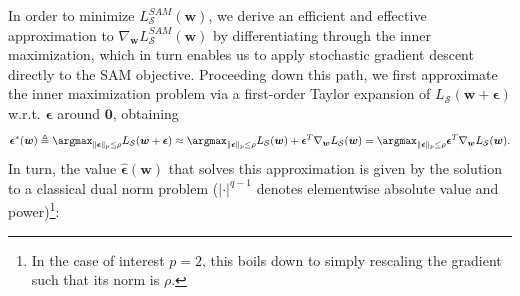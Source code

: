 \documentclass{article} %
\begin{document}
In order to minimize $L^{SAM}_\mathcal{S}(\boldsymbol{w})$, we derive an efficient and effective approximation to $\nabla_{\boldsymbol{w}} L^{SAM}_\mathcal{S}(\boldsymbol{w})$ by differentiating through the inner maximization, which in turn enables us to apply stochastic gradient descent directly to the SAM objective.  Proceeding down this path, we first approximate the inner maximization problem via a first-order Taylor expansion of $L_\mathcal{S}(\boldsymbol{w}+\boldsymbol{\epsilon})$ w.r.t. $\boldsymbol{\epsilon}$ around $\boldsymbol{0}$, obtaining
$${\boldsymbol{\epsilon}^*}(\boldsymbol{w}) \triangleq \argmax_{\|\boldsymbol{\epsilon}\|_p \leq \rho} L_\mathcal{S}(\boldsymbol{w}+\boldsymbol{\epsilon}) \approx \argmax_{\|\boldsymbol{\epsilon}\|_p \leq \rho} L_\mathcal{S}(\boldsymbol{w}) + \boldsymbol{\epsilon}^T \nabla_{\boldsymbol{w}} L_\mathcal{S}(\boldsymbol{w}) = \argmax_{\|\boldsymbol{\epsilon}\|_p \leq \rho} \boldsymbol{\epsilon}^T \nabla_{\boldsymbol{w}} L_\mathcal{S}(\boldsymbol{w}).$$
In turn, the value $\hat{\boldsymbol{\epsilon}}(\boldsymbol{w})$ that solves this approximation is given by the solution to a classical dual norm problem ($|\cdot |^{q-1}$ denotes elementwise absolute value and power)\footnote{In the case of interest $p=2$, this boils down to simply rescaling the gradient such that its norm is $\rho$.}:
\end{document}
